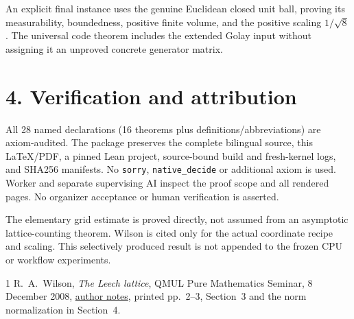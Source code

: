 \documentclass[10pt]{article}
\begin{document}
An explicit final instance uses the genuine Euclidean closed unit ball, proving its measurability, boundedness, positive finite volume, and the positive scaling $1/\sqrt8$. The universal code theorem includes the extended Golay input without assigning it an unproved concrete generator matrix.

\section*{4. Verification and attribution}
All 28 named declarations (16 theorems plus definitions/abbreviations) are axiom-audited. The package preserves the complete bilingual source, this LaTeX/PDF, a pinned Lean project, source-bound build and fresh-kernel logs, and SHA256 manifests. No \texttt{sorry}, \texttt{native\_decide} or additional axiom is used. Worker and separate supervising AI inspect the proof scope and all rendered pages. No organizer acceptance or human verification is asserted.

The elementary grid estimate is proved directly, not assumed from an asymptotic lattice-counting theorem. Wilson is cited only for the actual coordinate recipe and scaling. This selectively produced result is not appended to the frozen CPU or workflow experiments.
\begin{thebibliography}{1}
 R.~A.~Wilson, \emph{The Leech lattice}, QMUL Pure Mathematics Seminar, 8 December 2008, \href{https://webspace.maths.qmul.ac.uk/r.a.wilson/talks_files/Leech.pdf}{author notes}, printed pp.~2--3, Section~3 and the norm normalization in Section~4.
\end{thebibliography}
\end{document}
